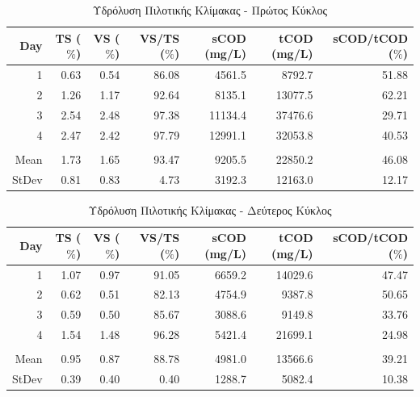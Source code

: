 \documentclass[11pt]{report}
\begin{document}
\begin{table}[htbp]
\caption{\label{tab:org4b5c81f}Υδρόλυση Πιλοτικής Κλίμακας - Πρώτος Κύκλος}
\centering
\begin{tabular}{rrrrrrr}
Day & TS (\(\%\)) & VS (\(\%\)) & VS/TS (\(\%\)) & sCOD (mg/L) & tCOD (mg/L) & sCOD/tCOD (\(\%\))\\[0pt]
\hline
1 & 0.63 & 0.54 & 86.08 & 4561.5 & 8792.7 & 51.88\\[0pt]
2 & 1.26 & 1.17 & 92.64 & 8135.1 & 13077.5 & 62.21\\[0pt]
3 & 2.54 & 2.48 & 97.38 & 11134.4 & 37476.6 & 29.71\\[0pt]
4 & 2.47 & 2.42 & 97.79 & 12991.1 & 32053.8 & 40.53\\[0pt]
 &  &  &  &  &  & \\[0pt]
Mean & 1.73 & 1.65 & 93.47 & 9205.5 & 22850.2 & 46.08\\[0pt]
StDev & 0.81 & 0.83 & 4.73 & 3192.3 & 12163.0 & 12.17\\[0pt]
\end{tabular}
\end{table}

\begin{table}[htbp]
\caption{\label{tab:orgd6d9eb3}Υδρόλυση Πιλοτικής Κλίμακας - Δεύτερος Κύκλος}
\centering
\begin{tabular}{rrrrrrr}
Day & TS (\(\%\)) & VS (\(\%\)) & VS/TS (\(\%\)) & sCOD (mg/L) & tCOD (mg/L) & sCOD/tCOD (\(\%\))\\[0pt]
\hline
1 & 1.07 & 0.97 & 91.05 & 6659.2 & 14029.6 & 47.47\\[0pt]
2 & 0.62 & 0.51 & 82.13 & 4754.9 & 9387.8 & 50.65\\[0pt]
3 & 0.59 & 0.50 & 85.67 & 3088.6 & 9149.8 & 33.76\\[0pt]
4 & 1.54 & 1.48 & 96.28 & 5421.4 & 21699.1 & 24.98\\[0pt]
 &  &  &  &  &  & \\[0pt]
Mean & 0.95 & 0.87 & 88.78 & 4981.0 & 13566.6 & 39.21\\[0pt]
StDev & 0.39 & 0.40 & 0.40 & 1288.7 & 5082.4 & 10.38\\[0pt]
\end{tabular}
\end{table}
\end{document}
